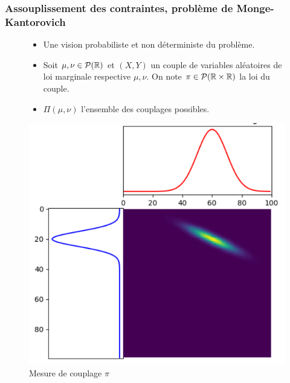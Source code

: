 \documentclass{beamer}
\theoremstyle{definition}
\begin{document}
\begin{frame}
	\frametitle{Assouplissement des contraintes, problème de Monge-Kantorovich}
		\begin{minipage}[t]{1\linewidth}
	\begin{minipage}{0.44\linewidth}\centering\begin{figure}
			\begin{itemize}
				\item Une vision probabiliste et non déterministe du problème. 
				\item Soit $\mu,\nu\in \mathcal P(\mathbb{R})$ et $(X,Y)$ un couple de variables aléatoires de loi marginale respective $\mu,\nu$. On note $\pi\in\mathcal P(\mathbb{R}\times\mathbb{R})$ la loi du couple. 
				\item $\Pi(\mu, \nu)$ l'ensemble des couplages possibles.   
			\end{itemize}
	\end{figure}\end{minipage}\hfil
	\begin{minipage}{0.43\linewidth}\centering\begin{figure}
			\includegraphics[scale=0.3]{couplage.png}			
			\caption{Mesure de couplage $\pi$}
	\end{figure}\end{minipage}
\end{minipage}
\end{frame}
\end{document}
